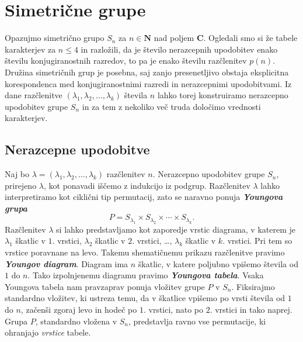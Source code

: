 \documentclass[11pt]{book}
\def\NN{\mathbf{N}}
\def\CC{\mathbf{C}}
\def\definicija{\color{rdeca}\bf\em}
\theoremstyle{definition}
\theoremstyle{zgled}
\theoremstyle{odprtproblem}
\theoremstyle{domacanaloga}
\theoremstyle{izrek}
\begin{document}
\section{Simetrične grupe}

Opazujmo simetrično grupo $S_n$ za $n \in \NN$ nad poljem $\CC$. Ogledali smo si že tabele karakterjev za $n \leq 4$ in razložili, da je število nerazcepnih upodobitev enako številu konjugiranostnih razredov, to pa je enako številu razčlenitev $p(n)$. Družina simetričnih grup je posebna, saj zanjo presenetljivo obstaja eksplicitna korespondenca med konjugiranostnimi razredi in nerazcepnimi upodobitvami. Iz dane razčlenitve $(\lambda_1, \lambda_2, \dots, \lambda_k)$ števila $n$ lahko torej konstruiramo nerazcepno upodobitev grupe $S_n$ in za tem z nekoliko več truda določimo vrednosti karakterjev.

\subsection{Nerazcepne upodobitve}

Naj bo $\lambda = (\lambda_1, \lambda_2, \dots, \lambda_k)$ razčlenitev $n$. Nerazcepno upodobitev grupe $S_n$, prirejeno $\lambda$, kot ponavadi iščemo z indukcijo iz podgrup. Razčlenitev $\lambda$ lahko interpretiramo kot ciklični tip permutacij, zato se naravno ponuja {\definicija Youngova grupa}
\[
    P = S_{\lambda_1} \times S_{\lambda_2} \times \cdots \times S_{\lambda_k}.
\]
Razčlenitev $\lambda$ si lahko predstavljamo kot zaporedje vrstic diagrama, v katerem je $\lambda_1$ škatlic v $1$. vrstici, $\lambda_2$ škatlic v $2$. vrstici, \dots, $\lambda_k$ škatlic v $k$. vrstici. Pri tem so vrstice poravnane na levo. Takemu shematičnemu prikazu razčlenitve pravimo {\definicija Youngov diagram}. Diagram ima $n$ škatlic, v katere poljubno vpišemo števila od $1$ do $n$. Tako izpolnjenemu diagramu pravimo {\definicija Youngova tabela}. Vsaka Youngova tabela nam pravzaprav ponuja vložitev grupe $P$ v $S_n$. Fiksirajmo standardno vložitev, ki ustreza temu, da v škatlice vpišemo po vrsti števila od $1$ do $n$, začenši zgoraj levo in hodeč po $1$. vrstici, nato po $2$. vrstici in tako naprej. Grupa $P$, standardno vložena v $S_n$, predstavlja ravno vse permutacije, ki ohranjajo \emph{vrstice} tabele. 
\end{document}
